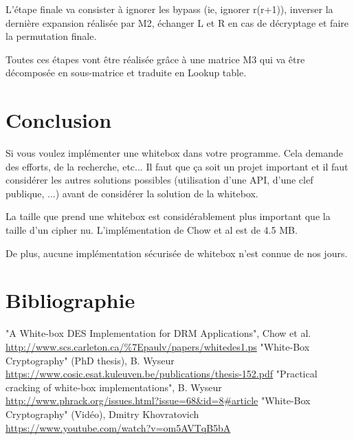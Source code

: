 \documentclass[a4paper,12pt]{article}
\begin{document}
L'étape finale va consister à ignorer les bypass (ie, ignorer r(r+1)), inverser la dernière expansion réalisée par M2, échanger L et R en cas de décryptage et faire la permutation finale.

Toutes ces étapes vont être réalisée grâce à une matrice M3 qui va être décomposée en sous-matrice et traduite en Lookup table.

\newpage

\section{Conclusion}

Si vous voulez implémenter une whitebox dans votre programme. Cela demande des efforts, de la recherche, etc... Il faut que ça soit un projet important et il faut considérer les autres solutions possibles (utilisation d'une API, d'une clef publique, ...) avant de considérer la solution de la whitebox.

La taille que prend une whitebox est considérablement plus important que la taille d'un cipher nu. L'implémentation de Chow et al est de 4.5 MB.

De plus, aucune implémentation sécurisée de whitebox n'est connue de nos jours.

\newpage

\section{Bibliographie}

"A White-box DES Implementation for DRM Applications", Chow et al.\\
\url{http://www.scs.carleton.ca/%7Epaulv/papers/whitedes1.ps}
"White-Box Cryptography" (PhD thesis), B. Wyseur\\
\url{https://www.cosic.esat.kuleuven.be/publications/thesis-152.pdf}
"Practical cracking of white-box implementations", B. Wyseur\\
\url{http://www.phrack.org/issues.html?issue=68&id=8#article}
"White-Box Cryptography" (Vidéo), Dmitry Khovratovich\\
\url{https://www.youtube.com/watch?v=om5AVTqB5bA}
\end{document}
